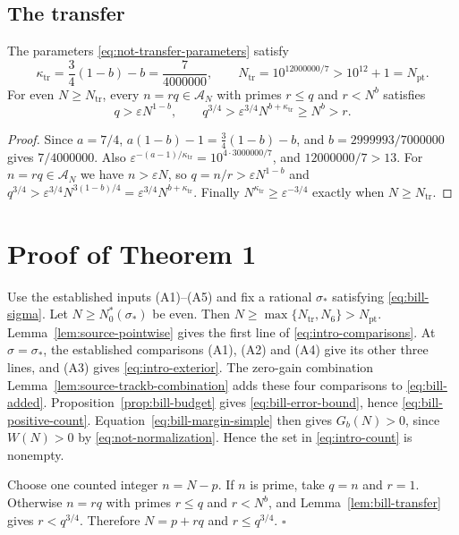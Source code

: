 \subsection{The transfer}

\begin{lemma}[Transfer]\label{lem:bill-transfer}
The parameters \eqref{eq:not-transfer-parameters} satisfy
\begin{equation}\label{eq:bill-transfer-parameters}
 \kappa_{\mathrm{tr}}=\frac34(1-b)-b=\frac7{4000000},\qquad
 N_{\mathrm{tr}}=10^{12000000/7}>10^{12}+1=N_{\mathrm{pt}}.
\end{equation}
For even $N\ge N_{\mathrm{tr}}$, every $n=rq\in\mathcal A_N$ with primes
$r\le q$ and $r<N^b$ satisfies
\begin{equation}\label{eq:bill-transfer}
 q>\varepsilon N^{1-b},\qquad
 q^{3/4}>\varepsilon^{3/4}N^{b+\kappa_{\mathrm{tr}}}\ge N^b>r.
\end{equation}
\end{lemma}

\begin{proof}
Since $a=7/4$, $a(1-b)-1=\frac34(1-b)-b$, and $b=2999993/7000000$ gives
$7/4000000$. Also $\varepsilon^{-(a-1)/\kappa_{\mathrm{tr}}}
=10^{4\cdot3000000/7}$, and $12000000/7>13$.
For $n=rq\in\mathcal A_N$ we have $n>\varepsilon N$, so
$q=n/r>\varepsilon N^{1-b}$ and
$q^{3/4}>\varepsilon^{3/4}N^{3(1-b)/4}=\varepsilon^{3/4}N^{b+\kappa_{\mathrm{tr}}}$.
Finally $N^{\kappa_{\mathrm{tr}}}\ge\varepsilon^{-3/4}$ exactly when
$N\ge N_{\mathrm{tr}}$.
\end{proof}

\section*{Proof of Theorem 1}

Use the established inputs \textup{(A1)}--\textup{(A5)} and fix a rational
$\sigma_*$ satisfying \eqref{eq:bill-sigma}. Let
$N\ge N_0^*(\sigma_*)$ be even. Then
$N\ge\max\{N_{\mathrm{tr}},N_6\}>N_{\mathrm{pt}}$.
Lemma~\ref{lem:source-pointwise} gives the first line of
\eqref{eq:intro-comparisons}. At $\sigma=\sigma_*$, the established
comparisons \textup{(A1)}, \textup{(A2)} and \textup{(A4)} give its other
three lines, and \textup{(A3)} gives \eqref{eq:intro-exterior}.
The zero-gain combination
Lemma~\ref{lem:source-trackb-combination} adds these four comparisons to
\eqref{eq:bill-added}. Proposition~\ref{prop:bill-budget} gives
\eqref{eq:bill-error-bound}, hence \eqref{eq:bill-positive-count}.
Equation~\eqref{eq:bill-margin-simple} then gives $G_b(N)>0$, since
$W(N)>0$ by \eqref{eq:not-normalization}.
Hence the set in \eqref{eq:intro-count} is nonempty.

Choose one counted integer $n=N-p$.
If $n$ is prime, take $q=n$ and $r=1$.
Otherwise $n=rq$ with primes $r\le q$ and $r<N^b$, and
Lemma~\ref{lem:bill-transfer} gives $r<q^{3/4}$.
Therefore $N=p+rq$ and $r\le q^{3/4}$. $\square$
